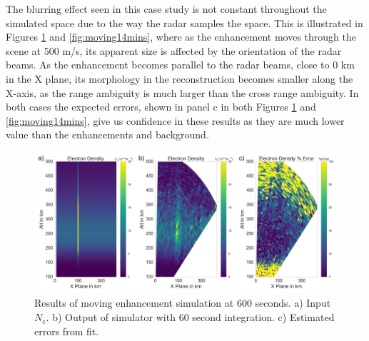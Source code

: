 The blurring effect seen in this case study is not constant throughout the simulated space due to the way the radar samples the space. This is illustrated in Figures \ref{fig:moving10mins} and \ref{fig:moving14mins}, where as the enhancement moves through the scene at 500 m/s, its apparent size is affected by the orientation of the radar beams. 
As the enhancement becomes parallel to the radar beams, close to 0 km in the X plane,
its morphology in the reconstruction becomes smaller along the X-axis, as the range ambiguity is much larger than the cross range ambiguity. In both cases the expected errors, shown in panel c in both Figures \ref{fig:moving10mins} and \ref{fig:moving14mins}, give us confidence in these results as they are much lower value than the enhancements and background.
\begin{figure}[!t]
\centering
\includegraphics[width=6in]{moving6mins}
\caption{Results of moving enhancement simulation at 600 seconds. a) Input $N_e$. b) Output of simulator with 60 second integration. c) Estimated errors from fit.}
\label{fig:moving10mins}
\end{figure}


